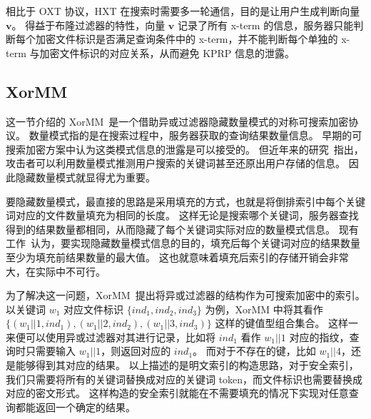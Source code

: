 相比于 OXT 协议，HXT 在搜索时需要多一轮通信，目的是让用户生成判断向量 $\mathbf{v}$。
%
得益于布隆过滤器的特性，向量 $\mathbf{v}$ 记录了所有 x-term 的信息，服务器只能判断每个加密文件标识是否满足查询条件中的 x-term，并不能判断每个单独的 x-term 与加密文件标识的对应关系，从而避免 KPRP 信息的泄露。


\subsection{XorMM}

这一节介绍的 XorMM~\cite{wang2022practical}是一个借助异或过滤器隐藏数量模式的对称可搜索加密协议。
数量模式指的是在搜索过程中，服务器获取的查询结果数量信息。
早期的可搜索加密方案中认为这类模式信息的泄露是可以接受的。
但近年来的研究~\cite{grubbs2018pump,gui2019encrypted,blackstone2020revisiting}指出，攻击者可以利用数量模式推测用户搜索的关键词甚至还原出用户存储的信息。
因此隐藏数量模式就显得尤为重要。

要隐藏数量模式，最直接的思路是采用填充的方式，也就是将倒排索引中每个关键词对应的文件数量填充为相同的长度。
这样无论是搜索哪个关键词，服务器查找得到的结果数量都相同，从而隐藏了每个关键词实际对应的数量模式信息。
现有工作~\cite{ando2022cost}认为，要实现隐藏数量模式信息的目的，填充后每个关键词对应的结果数量至少为填充前结果数量的最大值。
这也就意味着填充后索引的存储开销会非常大，在实际中不可行。

为了解决这一问题，XorMM~\cite{wang2022practical}提出将异或过滤器的结构作为可搜索加密中的索引。
以关键词 $w_1$ 对应文件标识 $\{ind_1, ind_2, ind_3\}$ 为例，XorMM 中将其看作 $\{(w_1 ||1, ind_1), (w_1 || 2, ind_2), (w_1 || 3, ind_3)\}$ 这样的键值型组合集合。
这样一来便可以使用异或过滤器对其进行记录，比如将 $ind_1$ 看作 $w_1 || 1$ 对应的指纹，查询时只需要输入 $w_1 || 1$，则返回对应的 $ind_1$。
而对于不存在的键，比如 $w_1||4$，还是能够得到其对应的结果。
以上描述的是明文索引的构造思路，对于安全索引，我们只需要将所有的关键词替换成对应的关键词 token，而文件标识也需要替换成对应的密文形式。
这样构造的安全索引就能在不需要填充的情况下实现对任意查询都能返回一个确定的结果。

